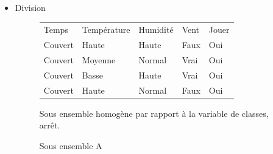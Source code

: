 \documentclass[a4paper, 11pt]{report}
\begin{document}
\begin{itemize}
\begin{enumerate}
\begin{table}[!h]
\begin{small}
\begin{tabular}{cc}
    \begin{minipage}{.5\linewidth}
\begin{tabular}{| l | l | l |}
\hline
 & Oui & Non\\
\hline
Haute & $\frac{6*9}{14} = 3.86$ & $\frac{6*5}{14} = 2.14$\\
\hline
Basse & $\frac{8*9}{14} = 5.14$ & $\frac{8*5}{14} = 2.86$ \\
\hline
\end{tabular} 
      \caption{Tableau d'estimation}
 
    \end{minipage} 
\end{tabular}
\end{small}
\end{table}

$X^2(Humidité) = \frac{(3-3.86)^2}{3.86}+\frac{(3-2.14)^2}{2.14}+\frac{(6-5.14)^2}{5.14}+\frac{(2-2.86)^2}{2.86}\\
X^2(Temps) = 0.94$

\end{enumerate}
La division se fera par rapport à l'attribut Temps (celui ayant la plus grande valeur $X^2$
\newpage
\item Division

\begin{figure}[!h]
\begin{center}

\begin{tabular}{| l | l | l | l | l |}
\hline
\rowcolor{gray!25}
Temps & Température & Humidité & Vent & Jouer \\
Couvert & Haute & Haute & Faux & \cellcolor{yellow}Oui \\
Couvert & Moyenne & Normal & Vrai &  \cellcolor{yellow}Oui \\
Couvert & Basse & Haute & Vrai &  \cellcolor{yellow}Oui \\
\hline
Couvert & Haute & Normal & Faux &  \cellcolor{yellow}Oui \\
\hline
\end{tabular}
\end{center}
\end{figure}


\begin{figure}[!h]
\begin{center}

\caption{Sous ensemble A}

\end{center}
Sous ensemble homogène par rapport à la variable de classes, arrêt.
\end{figure}


\end{itemize}
\end{document}
